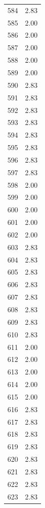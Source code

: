 \documentclass[a4paper,11pt]{article}
\begin{document}
\begin{center}
\begin{longtable}{|R{1.5cm}|R{2.5cm}|}
  584  &         2.83 \\ 
  585  &         2.00 \\ 
  586  &         2.00 \\ 
  587  &         2.00 \\ 
  588  &         2.00 \\ 
  589  &         2.00 \\ 
  590  &         2.83 \\ 
  591  &         2.83 \\ 
  592  &         2.83 \\ 
  593  &         2.83 \\ 
  594  &         2.83 \\ 
  595  &         2.83 \\ 
  596  &         2.83 \\ 
  597  &         2.83 \\ 
  598  &         2.00 \\ 
  599  &         2.00 \\ 
  600  &         2.00 \\ 
  601  &         2.00 \\ 
  602  &         2.00 \\ 
  603  &         2.83 \\ 
  604  &         2.83 \\ 
  605  &         2.83 \\ 
  606  &         2.83 \\ 
  607  &         2.83 \\ 
  608  &         2.83 \\ 
  609  &         2.83 \\ 
  610  &         2.83 \\ 
  611  &         2.00 \\ 
  612  &         2.00 \\ 
  613  &         2.00 \\ 
  614  &         2.00 \\ 
  615  &         2.00 \\ 
  616  &         2.83 \\ 
  617  &         2.83 \\ 
  618  &         2.83 \\ 
  619  &         2.83 \\ 
  620  &         2.83 \\ 
  621  &         2.83 \\ 
  622  &         2.83 \\ 
  623  &         2.83 \\ 

\end{longtable}
\end{center}
\end{document}

